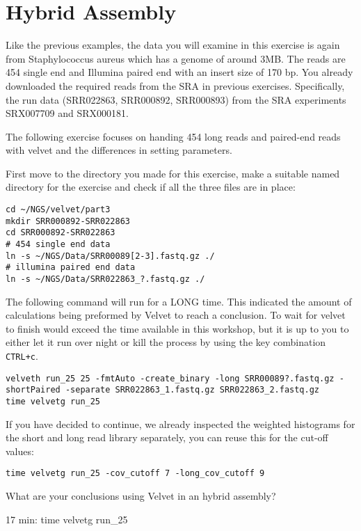 \section{Hybrid Assembly}
\begin{note}
Like the previous examples, the data you will examine in this exercise is again
from Staphylococcus aureus which has a genome of around 3MB. The reads are 454
single end and Illumina paired end with an insert size of 170 bp.
You already downloaded the required reads from the SRA in previous exercises.
Specifically, the run data (SRR022863, SRR000892, SRR000893) from the SRA
experiments SRX007709 and SRX000181.
\end{note}

\begin{information}
The following exercise focuses on handing 454 long reads and paired-end reads
with velvet and the differences in setting parameters.
\end{information}

\begin{steps}
First move to the directory you made for this exercise, make a suitable named
directory for the exercise and check if all the three files are in place:
\begin{lstlisting}
cd ~/NGS/velvet/part3
mkdir SRR000892-SRR022863 
cd SRR000892-SRR022863
# 454 single end data
ln -s ~/NGS/Data/SRR00089[2-3].fastq.gz ./
# illumina paired end data
ln -s ~/NGS/Data/SRR022863_?.fastq.gz ./
\end{lstlisting}
\end{steps}

\begin{warning}
The following command will run for a LONG time. This indicated the amount of
calculations being preformed by Velvet to reach a conclusion. To wait for velvet
to finish would exceed the time available in this workshop, but it is up to you
to either let it run over night or kill the process by using the key combination
\texttt{CTRL+c}.
\begin{lstlisting}
velveth run_25 25 -fmtAuto -create_binary -long SRR00089?.fastq.gz -shortPaired -separate SRR022863_1.fastq.gz SRR022863_2.fastq.gz
time velvetg run_25
\end{lstlisting}

\begin{steps}
If you have decided to continue, we already inspected the weighted histograms
for the short and long read library separately, you can reuse this for the
cut-off values:
\begin{lstlisting}
time velvetg run_25 -cov_cutoff 7 -long_cov_cutoff 9
\end{lstlisting}
\end{steps}

\begin{questions}
What are your conclusions using Velvet in an hybrid assembly?
\begin{answer}
17 min:  time velvetg run\_25
\end{answer}
\end{questions}

\end{warning}